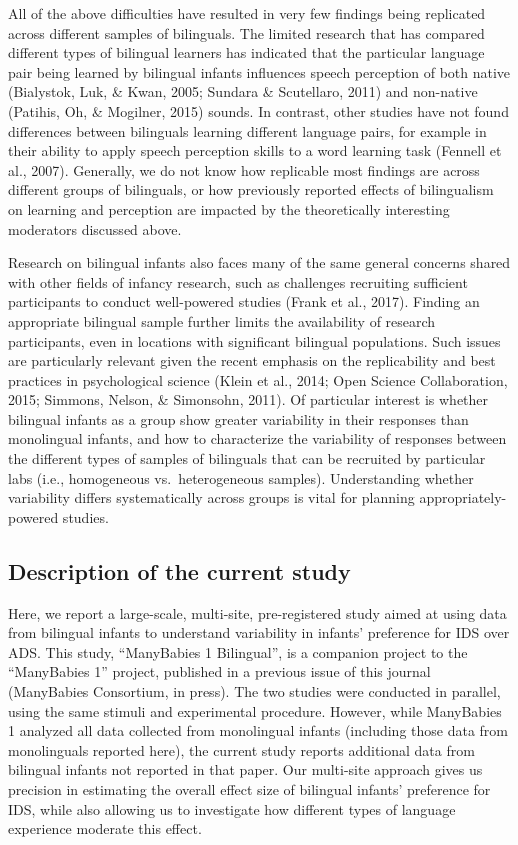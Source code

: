 \documentclass[english,,man,floatsintext]{apa6}
\begin{document}
All of the above difficulties have resulted in very few findings being replicated across different samples of bilinguals. The limited research that has compared different types of bilingual learners has indicated that the particular language pair being learned by bilingual infants influences speech perception of both native (Bialystok, Luk, \& Kwan, 2005; Sundara \& Scutellaro, 2011) and non-native (Patihis, Oh, \& Mogilner, 2015) sounds. In contrast, other studies have not found differences between bilinguals learning different language pairs, for example in their ability to apply speech perception skills to a word learning task (Fennell et al., 2007). Generally, we do not know how replicable most findings are across different groups of bilinguals, or how previously reported effects of bilingualism on learning and perception are impacted by the theoretically interesting moderators discussed above.

Research on bilingual infants also faces many of the same general concerns shared with other fields of infancy research, such as challenges recruiting sufficient participants to conduct well-powered studies (Frank et al., 2017). Finding an appropriate bilingual sample further limits the availability of research participants, even in locations with significant bilingual populations. Such issues are particularly relevant given the recent emphasis on the replicability and best practices in psychological science (Klein et al., 2014; Open Science Collaboration, 2015; Simmons, Nelson, \& Simonsohn, 2011). Of particular interest is whether bilingual infants as a group show greater variability in their responses than monolingual infants, and how to characterize the variability of responses between the different types of samples of bilinguals that can be recruited by particular labs (i.e., homogeneous vs.~heterogeneous samples). Understanding whether variability differs systematically across groups is vital for planning appropriately-powered studies.

\hypertarget{description-of-the-current-study}{%
\subsection{Description of the current study}\label{description-of-the-current-study}}

Here, we report a large-scale, multi-site, pre-registered study aimed at using data from bilingual infants to understand variability in infants' preference for IDS over ADS. This study, \enquote{ManyBabies 1 Bilingual}, is a companion project to the \enquote{ManyBabies 1} project, published in a previous issue of this journal (ManyBabies Consortium, in press). The two studies were conducted in parallel, using the same stimuli and experimental procedure. However, while ManyBabies 1 analyzed all data collected from monolingual infants (including those data from monolinguals reported here), the current study reports additional data from bilingual infants not reported in that paper. Our multi-site approach gives us precision in estimating the overall effect size of bilingual infants' preference for IDS, while also allowing us to investigate how different types of language experience moderate this effect.
\end{document}

